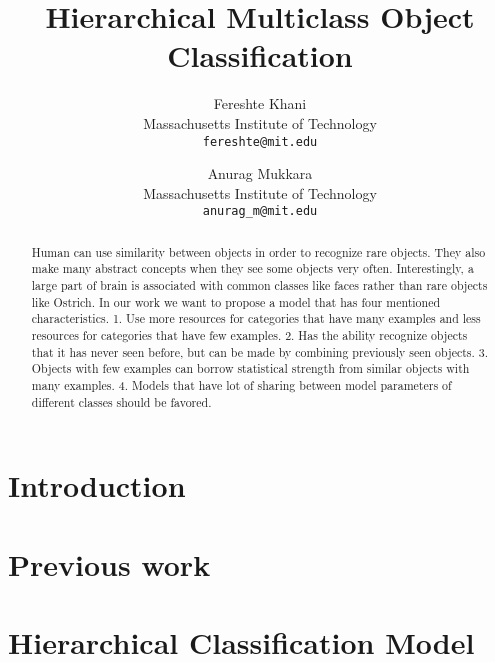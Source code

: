 \documentclass[10pt,twocolumn,letterpaper]{article}
\begin{document}
\title{Hierarchical Multiclass Object Classification }

\author{Fereshte Khani\\ 
Massachusetts Institute of Technology\\
{\tt\small fereshte@mit.edu}
\and
Anurag Mukkara\\
Massachusetts Institute of Technology\\
{\tt\small anurag\_m@mit.edu}
}

\maketitle

\begin{abstract}

Human can use similarity between objects in order to recognize rare objects. They also make many abstract concepts when they see some objects very often. Interestingly, a large part of brain is associated with common classes like faces rather than rare objects like Ostrich.
In our work we want to propose a model that has four mentioned characteristics. 1. Use more resources for categories that have many examples and less resources for categories that have few examples. 2. Has the ability recognize objects that it has never seen before, but can be made by combining previously seen objects. 3. Objects with few examples can borrow statistical strength from similar objects with many examples. 4. Models that have lot of sharing between model parameters of different classes should be favored.

\end{abstract}

\section{Introduction}

\section{Previous work}


\section{Hierarchical Classification Model}
\end{document}
